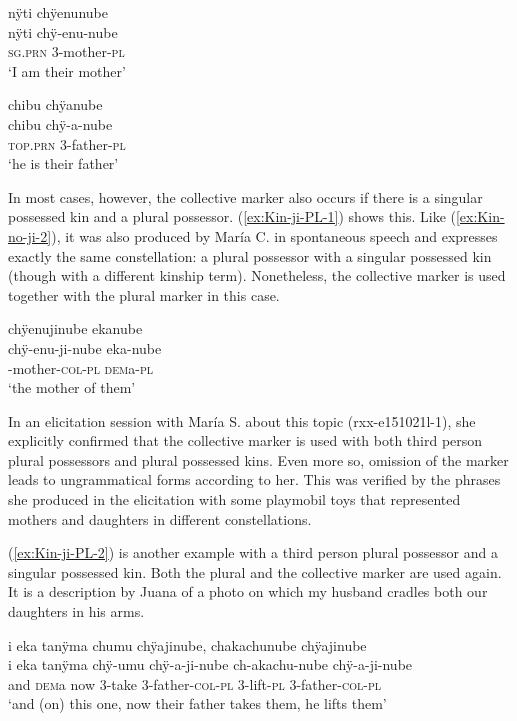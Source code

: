 \largerpage
\ea\label{ex:Kin-no-ji-1}
\begingl 
\glpreamble nÿti chÿenunube\\
\gla nÿti chÿ-enu-nube\\ 
\textsc{sg.prn} 3-mother-\textsc{pl}\\ 
\glft ‘I am their mother’
\trailingcitation{[mxx-e090728s-3.081]}
\xe

\ea\label{ex:Kin-no-ji-2}
\begingl 
\glpreamble chibu chÿanube\\
\gla chibu chÿ-a-nube\\ 
\textsc{top.prn} 3-father-\textsc{pl}\\ 
\glft ‘he is their father’
\trailingcitation{[cux-c120414ls-1.114]}
\xe

In most cases, however, the collective marker also occurs if there is a singular possessed kin and a plural possessor. (\ref{ex:Kin-ji-PL-1}) shows this. Like (\ref{ex:Kin-no-ji-2}), it was also produced by María C. in spontaneous speech and expresses exactly the same constellation: a plural possessor with a singular possessed kin (though with a different kinship term). Nonetheless, the collective marker is used together with the plural marker in this case.

\ea\label{ex:Kin-ji-PL-1}
\begingl 
\glpreamble chÿenujinube ekanube\\
\gla chÿ-enu-ji-nube eka-nube\\ 
-mother-\textsc{col}-\textsc{pl} \textsc{dem}a-\textsc{pl}\\ 
\glft ‘the mother of them’
\trailingcitation{[cux-c120410ls.124]}
\xe

In an elicitation session with María S. about this topic (rxx-e151021l-1), she explicitly confirmed that the collective marker is used with both third person plural possessors and plural possessed kins. Even more so, omission of the marker leads to ungrammatical forms according to her. This was verified by the phrases she produced in the elicitation with some playmobil toys that represented mothers and daughters in different constellations.

(\ref{ex:Kin-ji-PL-2}) is another example with a third person plural possessor and a singular possessed kin. Both the plural and the collective marker are used again. It is a description by Juana of a photo on which my husband cradles both our daughters in his arms. 

\ea\label{ex:Kin-ji-PL-2}
\begingl 
\glpreamble i eka tanÿma chumu chÿajinube, chakachunube chÿajinube\\
\gla i eka tanÿma chÿ-umu chÿ-a-ji-nube ch-akachu-nube chÿ-a-ji-nube\\ 
\glb and \textsc{dem}a now 3-take 3-father-\textsc{col}-\textsc{pl} 3-lift-\textsc{pl} 3-father-\textsc{col}-\textsc{pl}\\ 
\glft ‘and (on) this one, now their father takes them, he lifts them’
\trailingcitation{[jxx-p141024s-1.26]}
\xe


